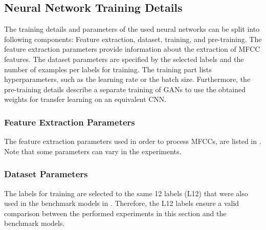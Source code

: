 
\subsection{Neural Network Training Details}\label{sec:exp_details_training}
The training details and parameters of the used neural networks can be split into following components: Feature extraction, dataset, training, and pre-training.
The feature extraction parameters provide information about the extraction of MFCC features.
The dataset parameters are specified by the selected labels and the number of examples per labels for training.
The training part lists hyperparameters, such as the learning rate or the batch size.
Furthermore, the pre-training details describe a separate training of GANs to use the obtained weights for transfer learning on an equivalent CNN.



\subsubsection{Feature Extraction Parameters}
The feature extraction parameters used in order to process MFCCs, are listed in .
Note that some parameters can vary in the experiments.




\subsubsection{Dataset Parameters}
The labels for training are selected to the same 12 labels (L12) that were also used in the benchmark models in .
Therefore, the L12 labels ensure a valid comparison between the performed experiments in this section and the benchmark models.

